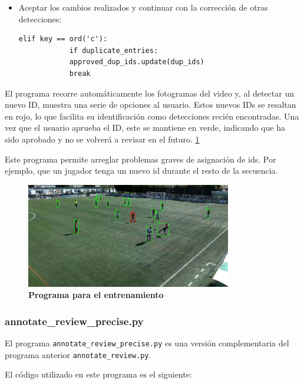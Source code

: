 \documentclass[12pt, a4paper, twoside]{article}
\begin{document}
\begin{itemize}
		\item Aceptar los cambios realizados y continuar con la corrección de otras detecciones:
		\begin{lstlisting}[style=pythonstyle]
			elif key == ord('c'):
			if duplicate_entries:
			approved_dup_ids.update(dup_ids)
			break
		\end{lstlisting}
	\end{itemize}
	
	
	El programa recorre automáticamente los fotogramas del video y, al detectar un nuevo ID, muestra una serie de opciones al usuario. Estos nuevos IDs se resaltan en rojo, lo que facilita su identificación como detecciones recién encontradas. Una vez que el usuario aprueba el ID, este se mantiene en verde, indicando que ha sido aprobado y no se volverá a revisar en el futuro. \ref{entr_reid}
	
	Este programa permite arreglar problemas graves de asignación de ids. Por ejemplo, que un jugador tenga un nuevo id durante el resto de la secuencia.
	
	\begin{figure}[H]
		\centering
		\includegraphics[width=0.8\textwidth]{image/entr_reid}
		\caption{\textbf{Programa para el entrenamiento}}
		\label{entr_reid}
	\end{figure}
	
	
	\subsubsection{annotate\_review\_precise.py}
	
	El programa \texttt{annotate\_review\_precise.py} es una versión complementaria del programa anterior \texttt{annotate\_review.py}.
	
	El código utilizado en este programa es el siguiente:
	\vspace{0.5cm}
	
\end{document}
